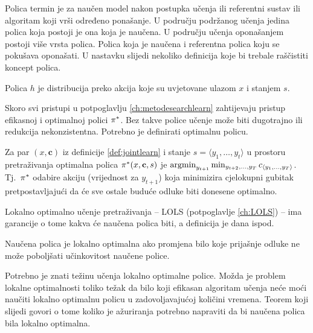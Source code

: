 Polica  termin je za naučen model nakon postupka učenja ili
referentni sustav ili algoritam koji vrši određeno ponašanje. U području
podržanog učenja jedina polica koja postoji je ona koja je naučena. U području
učenja oponašanjem  postoji više vrsta polica. Polica
koja je naučena i referentna polica koju se pokušava oponašati. U nastavku
slijedi nekoliko definicija koje bi trebale raščistiti koncept polica.

\begin{definition}[Polica]

  Polica $h$ je distribucija preko akcija koje su uvjetovane ulazom $x$ i
  stanjem $s$.

\end{definition}

\noindent
Skoro svi pristupi u potpoglavlju \ref{ch:metodesearchlearn} zahtijevaju pristup
efikasnoj i optimalnoj polici $\pi\ssymbol{1}$. Bez takve police učenje može
biti dugotrajno ili redukcija nekonzistentna. Potrebno je definirati optimalnu
policu.

\begin{definition}

  Za par $(x, \mathbf{c})$ iz definicije \ref{def:jointlearn} i stanje $s =
  \langle y_1, \ldots, y_t \rangle$ u prostoru pretraživanja optimalna polica
  $\pi\ssymbol{1}(x, \mathbf{c}, s)$ je $\operatorname*{argmin}_{y_{t+1}} \min_{y_{t+2},
  \ldots, y_T} c_{\langle y_1, \ldots, y_T \rangle}$. Tj.~$\pi\ssymbol{1}$
  odabire akciju (vrijednost za $y_{t+1}$) koja minimizira cjelokupni gubitak
  pretpostavljajući da će sve ostale buduće odluke biti donesene optimalno.

\end{definition}

\noindent
Lokalno optimalno učenje pretraživanja -- \textsc{LOLS} (potpoglavlje
\ref{ch:LOLS}) --  ima garancije o tome kakva će naučena polica biti, a
definicija je dana ispod.

\begin{definition}

  Naučena polica je lokalno optimalna ako promjena bilo koje prijašnje odluke ne
  može poboljšati učinkovitost naučene police.

\end{definition}

\noindent
Potrebno je znati težinu učenja lokalno optimalne police. Možda je problem
lokalne optimalnosti toliko težak da bilo koji efikasan algoritam učenja neće
moći naučiti lokalno optimalnu policu u zadovoljavajućoj količini vremena.
Teorem koji slijedi govori o tome koliko je ažuriranja potrebno napraviti da bi
naučena polica bila lokalno optimalna.

